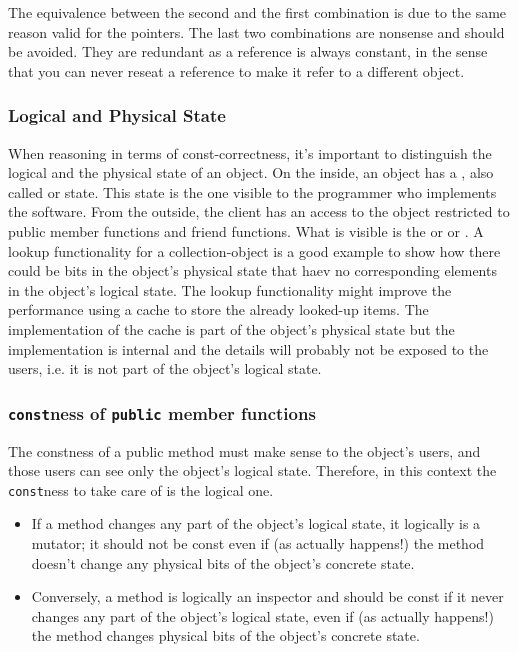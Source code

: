 The equivalence between the second and the first combination is due 
to the same reason valid for the pointers.
\newline
The last two combinations are nonsense and should be avoided. They are 
redundant as a reference is always constant, in the sense that you can 
never reseat a reference to make it refer to a different object.

\subsubsection{Logical and Physical State}
\label{subsubsec:logphystate}
When reasoning in terms of const-correctness, it's important to 
distinguish the logical and the physical state of an object.
\newline
On the inside, an object has a , also called 
 or  state. This state is the one 
visible to the programmer who implements the software. From the outside, 
the client has an access to the object restricted to public member 
functions and friend functions. What is visible is the  
or  or .
\newline
A lookup functionality for a collection-object is a good example to 
show how there could be bits in the object's physical state that haev 
no corresponding elements in the object's logical state. The lookup 
functionality might improve the performance using a cache to store 
the already looked-up items. The implementation of the cache is part of 
the object's physical state but the implementation is internal and 
the details will probably not be exposed to the users, i.e. it is not 
part of the object's logical state.

\subsubsection{\texttt{const}ness of \texttt{public} member functions}
The constness of a public method must make sense to the object's users, 
and those users can see only the object's logical state. Therefore, in 
this context the \texttt{const}ness to take care of is the logical one. 
\begin{itemize}    
    \item If a method changes any part of the object’s logical state, 
          it logically is a mutator; it should not be const even if 
          (as actually happens!) the method doesn’t change any physical 
          bits of the object’s concrete state.
    \item Conversely, a method is logically an inspector and should be 
          const if it never changes any part of the object’s logical 
          state, even if (as actually happens!) the method changes 
          physical bits of the object’s concrete state.
\end{itemize}

